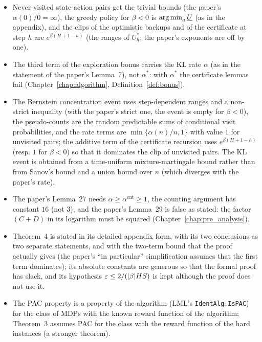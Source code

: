 \begin{itemize}
  \item Never-visited state-action pairs get the trivial bounds (the paper's $\alpha(0)/0 = \infty$),
        the greedy policy for $\beta < 0$ is $\operatorname*{arg\,min}_a \underline{U}$ (as in the appendix), and the
        clips of the optimistic backups and of the certificate at step $h$ are $e^{\beta(H+1-h)}$
        (the ranges of $U^*_h$; the paper's exponents are off by one).
  \item The third term of the exploration bonus carries the KL rate $\alpha$ (as in the
        statement of the paper's Lemma~7), not $\alpha^*$: with $\alpha^*$ the certificate
        lemmas fail (Chapter~\ref{chap:algorithm}, Definition~\ref{def:bonus}).
  \item The Bernstein concentration event uses step-dependent ranges and a non-strict
        inequality (with the paper's strict one, the event is empty for $\beta < 0$), the
        pseudo-counts are the random predictable sums of conditional visit probabilities, and
        the rate terms are $\min\{\alpha(n)/n, 1\}$ with value $1$ for unvisited pairs; the
        additive term of the certificate recursion uses $e^{\beta(H+1-h)}$ (resp. $1$ for
        $\beta < 0$) so that it dominates the clip of unvisited pairs. The KL event is obtained
        from a time-uniform mixture-martingale bound rather than from Sanov's bound and a union
        bound over $n$ (which diverges with the paper's rate).
  \item The paper's Lemma~27 needs $\alpha \ge \alpha^{\mathrm{cnt}} \ge 1$, the counting
        argument has constant $16$ (not $3$), and the paper's Lemma~29 is false as stated: the
        factor $(C + D)$ in its logarithm must be squared (Chapter~\ref{chap:pre_analysis}).
  \item Theorem~4 is stated in its detailed appendix form, with its two conclusions as two
        separate statements, and with the two-term bound that the proof actually gives (the
        paper's ``in particular'' simplification assumes that the first term dominates); its
        absolute constants are generous so that the formal proof has slack, and its
        hypothesis $\varepsilon \le 2/(|\beta| H S)$ is kept although the proof does not use it.
  \item The PAC property is a property of the algorithm (LML's \texttt{IdentAlg.IsPAC}) for the
        class of MDPs with the known reward function of the algorithm; Theorem~3 assumes PAC
        for the class with the reward function of the hard instances (a stronger theorem).

\end{itemize}
